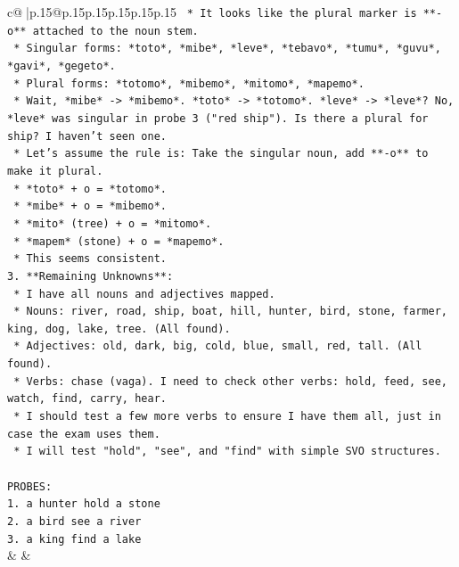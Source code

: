 \documentclass{article}
\begin{document}
{\begin{supertabular}{c@{$\;$}|p{.15\linewidth}@{}p{.15\linewidth}p{.15\linewidth}p{.15\linewidth}p{.15\linewidth}p{.15\linewidth}}
{{{\texttt{        *   It looks like the plural marker is **{-}o** attached to the noun stem.} \\
\texttt{        *   Singular forms: *toto*, *mibe*, *leve*, *tebavo*, *tumu*, *guvu*, *gavi*, *gegeto*.} \\
\texttt{        *   Plural forms: *totomo*, *mibemo*, *mitomo*, *mapemo*.} \\
\texttt{        *   Wait, *mibe* {-}> *mibemo*. *toto* {-}> *totomo*. *leve* {-}> *leve*? No, *leve* was singular in probe 3 ("red ship"). Is there a plural for ship? I haven't seen one.} \\
\texttt{        *   Let's assume the rule is: Take the singular noun, add **{-}o** to make it plural.} \\
\texttt{        *   *toto* + o = *totomo*.} \\
\texttt{        *   *mibe* + o = *mibemo*.} \\
\texttt{        *   *mito* (tree) + o = *mitomo*.} \\
\texttt{        *   *mapem* (stone) + o = *mapemo*.} \\
\texttt{        *   This seems consistent.} \\
\texttt{3.  **Remaining Unknowns**:} \\
\texttt{    *   I have all nouns and adjectives mapped.} \\
\texttt{    *   Nouns: river, road, ship, boat, hill, hunter, bird, stone, farmer, king, dog, lake, tree. (All found).} \\
\texttt{    *   Adjectives: old, dark, big, cold, blue, small, red, tall. (All found).} \\
\texttt{    *   Verbs: chase (vaga). I need to check other verbs: hold, feed, see, watch, find, carry, hear.} \\
\texttt{    *   I should test a few more verbs to ensure I have them all, just in case the exam uses them.} \\
\texttt{    *   I will test "hold", "see", and "find" with simple SVO structures.} \\
\\ 
\texttt{PROBES:} \\
\texttt{1. a hunter hold a stone} \\
\texttt{2. a bird see a river} \\
\texttt{3. a king find a lake} \\
            }
        }
    }
    & & \\ \\


\end{supertabular}}
\end{document}
